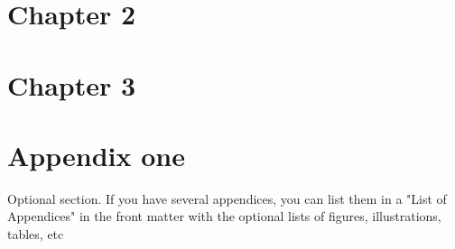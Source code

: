 \documentclass[12pt]{report}
\begin{document}
\chapter{Chapter 2}
\chapter{Chapter 3}
\appendix
\chapter{Appendix one}
\indent\indent Optional section. If you have several appendices, you can list them in a "List of Appendices" in the front matter with the optional lists of figures, illustrations, tables, etc


\singlespacing
\printbibliography
\end{document}
